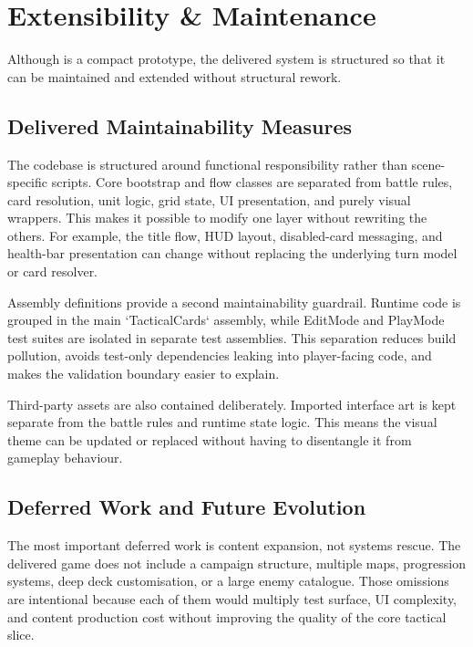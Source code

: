 \chapter{Extensibility \& Maintenance}

Although \projectname{} is a compact prototype, the delivered system is structured so that it can be maintained and extended without structural rework.

\section{Delivered Maintainability Measures}

The codebase is structured around functional responsibility rather than scene-specific scripts. Core bootstrap and flow classes are separated from battle rules, card resolution, unit logic, grid state, UI presentation, and purely visual wrappers. This makes it possible to modify one layer without rewriting the others. For example, the title flow, HUD layout, disabled-card messaging, and health-bar presentation can change without replacing the underlying turn model or card resolver.

Assembly definitions provide a second maintainability guardrail. Runtime code is grouped in the main `TacticalCards` assembly, while EditMode and PlayMode test suites are isolated in separate test assemblies. This separation reduces build pollution, avoids test-only dependencies leaking into player-facing code, and makes the validation boundary easier to explain.

Third-party assets are also contained deliberately. Imported interface art is kept separate from the battle rules and runtime state logic. This means the visual theme can be updated or replaced without having to disentangle it from gameplay behaviour.

\section{Deferred Work and Future Evolution}

The most important deferred work is content expansion, not systems rescue. The delivered game does not include a campaign structure, multiple maps, progression systems, deep deck customisation, or a large enemy catalogue. Those omissions are intentional because each of them would multiply test surface, UI complexity, and content production cost without improving the quality of the core tactical slice.

